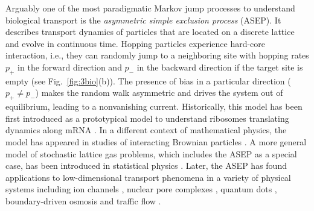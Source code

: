 \documentclass{tADP2e}
\theoremstyle{plain}
\theoremstyle{plain}
\theoremstyle{definition}
\begin{document}
Arguably one of the most paradigmatic Markov jump processes to understand biological transport is the {\emph{asymmetric simple exclusion process}} (ASEP). It describes transport dynamics of particles that are located on a discrete lattice and evolve in continuous time. Hopping particles experience hard-core interaction, i.e., they can randomly jump  to a neighboring site with hopping rates $p_{+}$ in the forward direction and $p_-$ in the backward direction if the target site is empty  (see Fig.~\ref{fig:3bio}(b)).  
The presence of bias in a particular direction ($p_{+}\neq p_-$)  makes the random walk asymmetric and drives the system out of equilibrium, leading to a nonvanishing current. Historically, this model has been first introduced as a prototypical model to understand ribosomes translating dynamics along mRNA \cite{MCT68,MCT69}. In a different context of mathematical physics, the model has appeared in studies of interacting Brownian particles \cite{FS70}. A more general model of stochastic lattice gas problems, which includes the ASEP as a special case, has been introduced in statistical physics \cite{KS84,BD98}. Later, the ASEP has found applications to low-dimensional transport phenomena in a variety of physical systems including ion channels \cite{CT98}, nuclear pore complexes \cite{ZAA07,JTT09}, quantum dots \cite{KT102}, boundary-driven osmosis \cite{CT99} and traffic flow \cite{Evans_1996,DC00}. 
 
\end{document}
